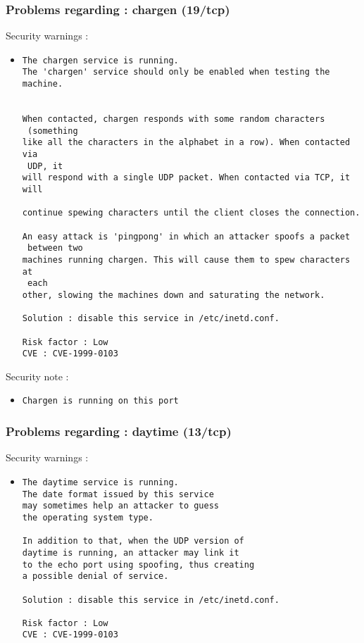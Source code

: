 \documentclass{article}
\begin{document}
\subsubsection{Problems regarding : chargen (19/tcp)}
Security warnings :\\
\begin{itemize}
\item \begin{verbatim}
The chargen service is running.
The 'chargen' service should only be enabled when testing the machine.
 

When contacted, chargen responds with some random characters
 (something
like all the characters in the alphabet in a row). When contacted via
 UDP, it 
will respond with a single UDP packet. When contacted via TCP, it will
 
continue spewing characters until the client closes the connection. 

An easy attack is 'pingpong' in which an attacker spoofs a packet
 between two
machines running chargen. This will cause them to spew characters at
 each 
other, slowing the machines down and saturating the network.
      
Solution : disable this service in /etc/inetd.conf.

Risk factor : Low
CVE : CVE-1999-0103
\end{verbatim}\end{itemize}
Security note :\\
\begin{itemize}
\item \begin{verbatim}
Chargen is running on this port
\end{verbatim}\end{itemize}
\subsubsection{Problems regarding : daytime (13/tcp)}
Security warnings :\\
\begin{itemize}
\item \begin{verbatim}
The daytime service is running.
The date format issued by this service
may sometimes help an attacker to guess
the operating system type. 

In addition to that, when the UDP version of
daytime is running, an attacker may link it 
to the echo port using spoofing, thus creating
a possible denial of service.

Solution : disable this service in /etc/inetd.conf.

Risk factor : Low
CVE : CVE-1999-0103
\end{verbatim}\end{itemize}
\end{document}
